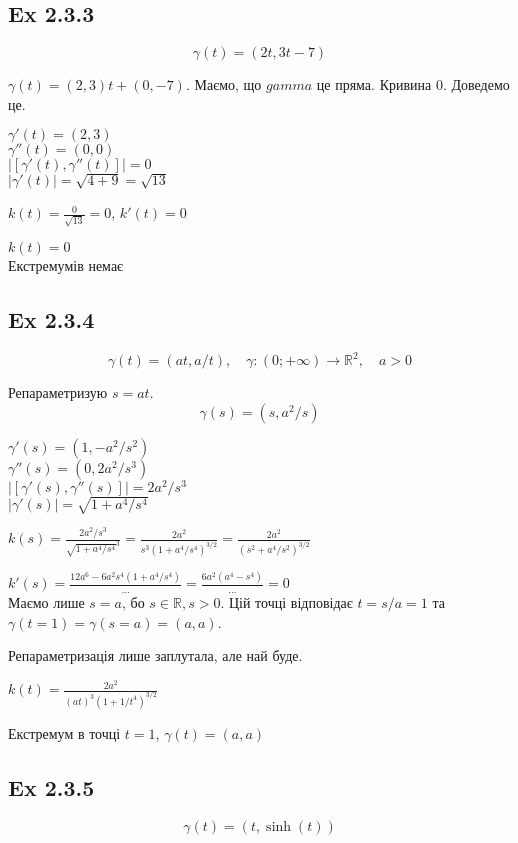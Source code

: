 \documentclass[10pt, a4paper]{article} %
\newcommand{\R}{\mathbb{R}}
\begin{document}
\subsection*{Ex 2.3.3}
\[\gamma(t) = (2t, 3t-7)\]

$\gamma(t) = (2, 3) t + (0, -7)$. Маємо, що $gamma$ це пряма. Кривина 0. Доведемо це.

$\gamma'(t) = (2, 3)$\\
$\gamma''(t) = (0, 0)$\\
$|[\gamma'(t), \gamma''(t)]| = 0$\\
$|\gamma'(t)| = \sqrt{4+9} = \sqrt{13}$

$k(t) = \frac{0}{\sqrt{13}} = 0$,
$k'(t) = 0$\\

\begin{mdframed}[backgroundcolor=green!20]
    $k(t) = 0$\\
    Екстремумів немає
\end{mdframed}

\subsection*{Ex 2.3.4}
\[\gamma(t) = (at, a/t), \quad \gamma : (0;+\infty) \to \R^2, \quad a>0\]

Репараметризую $s=at$.
\[\gamma(s) = (s, a^2/s)\]

$\gamma'(s) = (1, -a^2/s^2)$\\
$\gamma''(s) = (0, 2a^2/s^3)$\\
$|[\gamma'(s), \gamma''(s)]| = 2a^2/s^3$\\
$|\gamma'(s)| = \sqrt{1+a^4/s^4}$

$k(s) = \frac{2a^2/s^3}{\sqrt{1+a^4/s^4}^3} = \frac{2a^2}{s^3(1+a^4/s^4)^{3/2}} = \frac{2a^2}{(s^2+a^4/s^2)^{3/2}}$

$k'(s) = \frac{12a^6-6a^2s^4(1+a^4/s^4)}{...} = \frac{6a^2(a^4-s^4)}{...} = 0$\\
Маємо лише $s=a$, бо $s \in \R, s>0$.
Цій точці відповідає $t=s/a=1$ та $\gamma(t=1) = \gamma(s=a) = (a,a)$.

Репараметризація лише заплутала, але най буде.

\begin{mdframed}[backgroundcolor=green!20]
    $k(t) = \frac{2a^2}{(at)^3(1+1/t^4)^{3/2}}$

    Екстремум в точці $t=1$, $\gamma(t)=(a,a)$
\end{mdframed}


\subsection*{Ex 2.3.5}
\[\gamma(t) = (t, \sinh(t))\]
\end{document}
